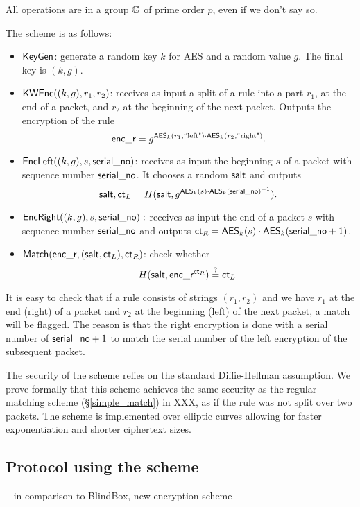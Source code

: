  All operations are in a group $\mathbb{G}$ of prime order $p$, even if we don't say so.  
 
 The scheme is as follows:
 \begin{itemize}
 \item $\mathsf{KeyGen}$: generate a random key $k$ for AES and a random value $g$. The final key is $(k, g)$. 
 \item $\mathsf{KWEnc}((k,g),  r_1, r_2)$: receives as input a split of a rule into a part $r_1$, at the end of a packet, and $r_2$ at the beginning of the next packet. Outputs the encryption of the rule \[ \mathsf{enc\_r} = g^{\mathsf{AES}_k(r_1, \text{``left"}) \cdot \mathsf{AES}_k(r_2, \text{``right"})}.\] 
 \item $\mathsf{EncLeft}((k, g), s, \mathsf{serial\_no})$: receives as input the beginning $s$ of a packet with sequence number $\mathsf{serial\_no}$. It chooses a random $\mathsf{salt}$ and outputs \[ \mathsf{salt}, \mathsf{ct}_L = H(\mathsf{salt}, g^{\mathsf{AES}_k(s) \cdot \mathsf{AES}_k(\mathsf{serial\_no})^{-1}}).\]
 \item $\mathsf{EncRight}((k, g), s, \mathsf{serial\_no}):$ receives as input the end of a packet $s$ with sequence number $\mathsf{serial\_no}$ and outputs $\mathsf{ct}_R = \mathsf{AES}_k(s) \cdot \mathsf{AES}_k(\mathsf{serial\_no}+1)$. 
 \item $\mathsf{Match}(\mathsf{enc\_r}, (\mathsf{salt}, \mathsf{ct}_L), \mathsf{ct}_R)$: check whether \[H(\mathsf{salt}, \mathsf{enc\_r}^{\mathsf{ct}_R}) \stackrel{?}{=} \mathsf{ct}_L.\]
 \end{itemize}
 
 It is easy to check that if a rule consists of strings $(r_1, r_2)$ and we have $r_1$ at the end (right) of a packet and $r_2$ at the beginning (left) of the next packet, a match will be flagged. 
 The reason is that the right encryption is done with a serial number of $\mathsf{serial\_no} +1$ to match the serial number of the left encryption of the subsequent packet. 
 
The security of the scheme relies on the standard Diffie-Hellman assumption. We prove formally that this scheme achieves the same security as the regular matching scheme (\S\ref{simple_match}) in XXX, as if the rule was not split over two packets. The scheme is implemented over elliptic curves allowing for faster exponentiation and shorter ciphertext sizes. 

 
\subsection{Protocol using the scheme} \label{sec:cross_prot}
 
 -- in comparison to BlindBox, new encryption scheme
 
